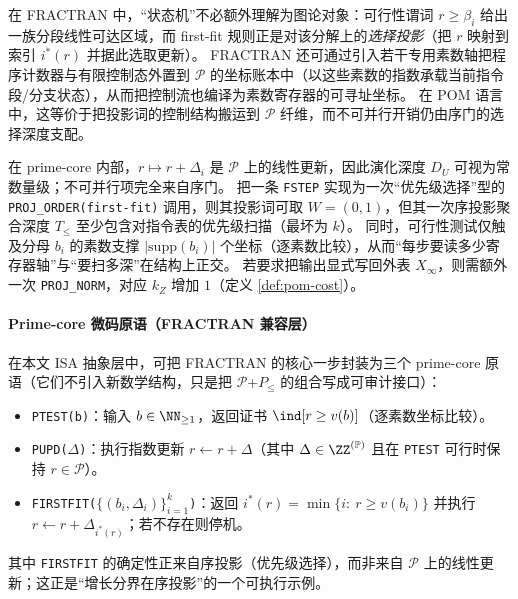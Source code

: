 \begin{remark}\label{rem:pom-fractran-controlflow}
在 FRACTRAN 中，“状态机”不必额外理解为图论对象：可行性谓词 \(r\ge \beta_i\) 给出一族分段线性可达区域，而 first-fit 规则正是对该分解上的\emph{选择投影}（把 \(r\) 映射到索引 \(i^\ast(r)\) 并据此选取更新）。
FRACTRAN 还可通过引入若干专用素数轴把程序计数器与有限控制态外置到 \(\mathcal{P}\) 的坐标账本中（以这些素数的指数承载当前指令段/分支状态），从而把控制流也编译为素数寄存器的可寻址坐标。
在 POM 语言中，这等价于把投影词的控制结构搬运到 \(\mathcal{P}\) 纤维，而不可并行开销仍由序门的选择深度支配。
\end{remark}

\begin{remark}\label{rem:pom-fractran-cost}
在 prime-core 内部，\(r\mapsto r+\Delta_i\) 是 \(\mathcal{P}\) 上的线性更新，因此演化深度 \(D_U\) 可视为常数量级；不可并行项完全来自序门。
把一条 \texttt{FSTEP} 实现为一次“优先级选择”型的 \texttt{PROJ\_ORDER(first-fit)} 调用，则其投影词可取 \(W=(0,1)\)，但其一次序投影聚合深度 \(T_{\le}\) 至少包含对指令表的优先级扫描（最坏为 \(k\)）。
同时，可行性测试仅触及分母 \(b_i\) 的素数支撑 \(|\mathrm{supp}(b_i)|\) 个坐标（逐素数比较），从而“每步要读多少寄存器轴”与“要扫多深”在结构上正交。
若要求把输出显式写回外表 \(X_\infty\)，则需额外一次 \texttt{PROJ\_NORM}，对应 \(k_Z\) 增加 \(1\)（定义 \ref{def:pom-cost}）。
\end{remark}

\paragraph{Prime-core 微码原语（FRACTRAN 兼容层）}
在本文 ISA 抽象层中，可把 FRACTRAN 的核心一步封装为三个 prime-core 原语（它们不引入新数学结构，只是把 \(\mathcal{P}\)+\(P_{\le}\) 的组合写成可审计接口）：
\begin{itemize}
  \item \texttt{PTEST(b)}：输入 \(b\in\NN_{\ge 1}\)，返回证书 \(\ind\!\left[r\ge v(b)\right]\)（逐素数坐标比较）。
  \item \texttt{PUPD($\Delta$)}：执行指数更新 \(r\leftarrow r+\Delta\)（其中 \(\Delta\in\ZZ^{(\mathbb{P})}\) 且在 \texttt{PTEST} 可行时保持 \(r\in\mathcal{P}\)）。
  \item \texttt{FIRSTFIT($\{(b_i,\Delta_i)\}_{i=1}^k$)}：返回 \(i^\ast(r)=\min\{i:\ r\ge v(b_i)\}\) 并执行 \(r\leftarrow r+\Delta_{i^\ast(r)}\)；若不存在则停机。
\end{itemize}
其中 \texttt{FIRSTFIT} 的确定性正来自序投影（优先级选择），而非来自 \(\mathcal{P}\) 上的线性更新；这正是“增长分界在序投影”的一个可执行示例。

